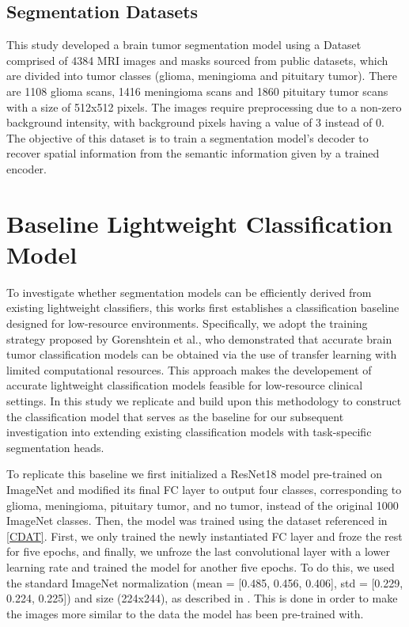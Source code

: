 \documentclass[conference]{IEEEtran}
\begin{document}
\subsection{Segmentation Datasets}\label{SDAT}

This study developed a brain tumor segmentation model using a Dataset comprised of 4384 MRI images and masks sourced from public datasets, which are divided into tumor classes (glioma, meningioma and pituitary tumor)\cite{Indra2025Kagg}. There are 1108 glioma scans, 1416 meningioma scans and 1860 pituitary tumor scans with a size of 512x512 pixels. The images require preprocessing due to a non-zero background intensity, with background pixels having a value of 3 instead of 0. The objective of this dataset is to train a segmentation model's decoder to recover spatial information from the semantic information given by a trained encoder.

\section{Baseline Lightweight Classification Model}

To investigate whether segmentation models can be efficiently derived from existing lightweight classifiers, this works first establishes a classification baseline designed for low-resource environments. Specifically, we adopt the training strategy proposed by Gorenshtein et al.\cite{Gorenshtein2025}, who demonstrated that accurate brain tumor classification models can be obtained via the use of transfer learning with limited computational resources. This approach makes the developement of accurate lightweight classification models feasible for low-resource clinical settings. In this study we replicate and build upon this methodology to construct the classification model that serves as the baseline for our subsequent investigation into extending existing classification models with task-specific segmentation heads. 

To replicate this baseline we first initialized a ResNet18 model pre-trained on ImageNet and modified its final FC layer to output four classes, corresponding to glioma, meningioma, pituitary tumor, and no tumor, instead of the original 1000 ImageNet classes. Then, the model was trained using the dataset referenced in \ref{CDAT}. First, we only trained the newly instantiated FC layer and froze the rest for five epochs, and finally, we unfroze the last convolutional layer with a lower learning rate and trained the model for another five epochs. To do this, we used the standard ImageNet normalization (mean = [0.485, 0.456, 0.406], std = [0.229, 0.224, 0.225]) and size (224x244), as described in \cite{Gorenshtein2025}. This is done in order to make the images more similar to the data the model has been pre-trained with. 
\end{document}
